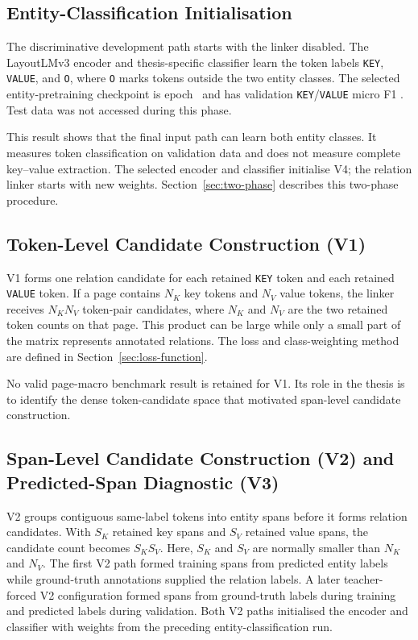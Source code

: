 \subsection{Entity-Classification Initialisation}
\label{sec:res2}

The discriminative development path starts with the linker disabled. The
LayoutLMv3 encoder and thesis-specific classifier learn the token labels
\texttt{KEY}, \texttt{VALUE}, and \texttt{O}, where \texttt{O} marks tokens
outside the two entity classes. The selected entity-pretraining checkpoint is
epoch~\VFourEntityPretrainEpoch{} and has validation \texttt{KEY}/\texttt{VALUE} micro F1
\VFourEntityPretrainMicroFOne{}. Test data was not accessed during this phase.

This result shows that the final input path can learn both entity classes. It
measures token classification on validation data and does not measure complete
key--value extraction. The selected encoder and classifier initialise V4; the
relation linker starts with new weights. Section~\ref{sec:two-phase} describes
this two-phase procedure.

\subsection{Token-Level Candidate Construction (V1)}
\label{sec:exp3}
\label{sec:res3}

V1 forms one relation candidate for each retained \texttt{KEY} token and each
retained \texttt{VALUE} token. If a page contains $N_K$ key tokens and $N_V$
value tokens, the linker receives $N_KN_V$ token-pair candidates, where $N_K$
and $N_V$ are the two retained token counts on that page. This product can be
large while only a small part of the matrix represents annotated relations.
The loss and class-weighting method are defined in
Section~\ref{sec:loss-function}.

No valid page-macro benchmark result is retained for V1. Its role in the thesis
is to identify the dense token-candidate space that motivated span-level
candidate construction.

\subsection{Span-Level Candidate Construction (V2) and Predicted-Span Diagnostic (V3)}
\label{sec:exp4}
\label{sec:res4}

V2 groups contiguous same-label tokens into entity spans before it forms
relation candidates. With $S_K$ retained key spans and $S_V$ retained value
spans, the candidate count becomes $S_KS_V$. Here, $S_K$ and $S_V$ are normally
smaller than $N_K$ and $N_V$. The first V2 path formed training spans from
predicted entity labels while ground-truth annotations supplied the relation
labels. A later teacher-forced V2 configuration formed spans from ground-truth
labels during training and predicted labels during validation. Both V2 paths
initialised the encoder and classifier with weights from the preceding
entity-classification run.

